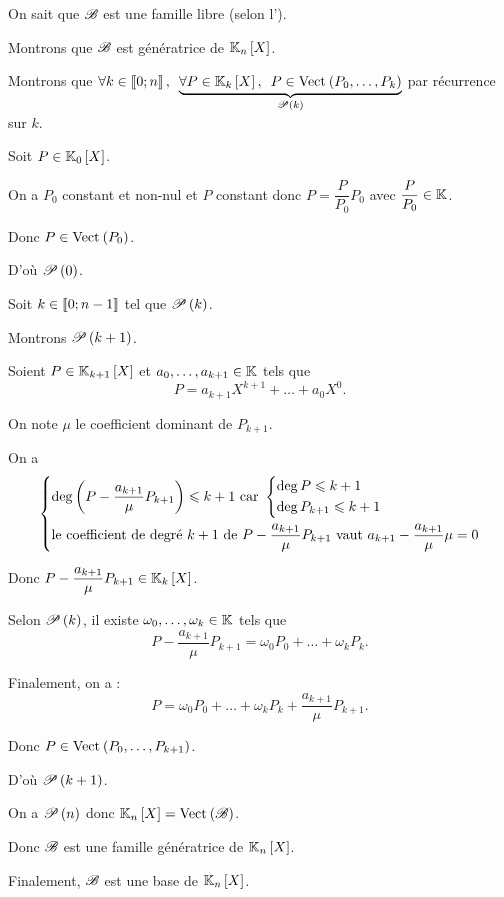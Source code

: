 \begin{dem}
On sait que \(\fami{B}\) est une famille libre (selon l').

Montrons que \(\fami{B}\) est génératrice de \(\polydeg{n}\).

Montrons que \(\quantifs{\forall k\in\interventierii{0}{n}}\underbrace{\quantifs{\forall P\in\polydeg{k}}P\in\Vect{P_0,\dots,P_k}}_{\P{k}}\) par récurrence sur \(k\).

Soit \(P\in\polydeg{0}\).

On a \(P_0\) constant et non-nul et \(P\) constant donc \(P=\dfrac{P}{P_0}P_0\) avec \(\dfrac{P}{P_0}\in\K\).

Donc \(P\in\Vect{P_0}\).

D'où \(\P{0}\).

Soit \(k\in\interventierii{0}{n-1}\) tel que \(\P{k}\).

Montrons \(\P{k+1}\).

Soient \(P\in\polydeg{k+1}\) et \(a_0,\dots,a_{k+1}\in\K\) tels que \[P=a_{k+1}X^{k+1}+\dots+a_0X^0.\]

On note \(\mu\) le coefficient dominant de \(P_{k+1}\).

On a \[\begin{dcases}
\deg\paren{P-\dfrac{a_{k+1}}{\mu}P_{k+1}}\leq k+1\text{ car }\begin{dcases}
\deg P\leq k+1 \\
\deg P_{k+1}\leq k+1
\end{dcases} \\
\text{le coefficient de degré }k+1\text{ de }P-\dfrac{a_{k+1}}{\mu}P_{k+1}\text{ vaut }a_{k+1}-\dfrac{a_{k+1}}{\mu}\mu=0
\end{dcases}\]

Donc \(P-\dfrac{a_{k+1}}{\mu}P_{k+1}\in\polydeg{k}\).

Selon \(\P{k}\), il existe \(\omega_0,\dots,\omega_k\in\K\) tels que \[P-\dfrac{a_{k+1}}{\mu}P_{k+1}=\omega_0P_0+\dots+\omega_kP_k.\]

Finalement, on a : \[P=\omega_0P_0+\dots+\omega_kP_k+\dfrac{a_{k+1}}{\mu}P_{k+1}.\]

Donc \(P\in\Vect{P_0,\dots,P_{k+1}}\).

D'où \(\P{k+1}\).

On a \(\P{n}\) donc \(\polydeg{n}=\Vect{\fami{B}}\).

Donc \(\fami{B}\) est une famille génératrice de \(\polydeg{n}\).

Finalement, \(\fami{B}\) est une base de \(\polydeg{n}\).
\end{dem}

